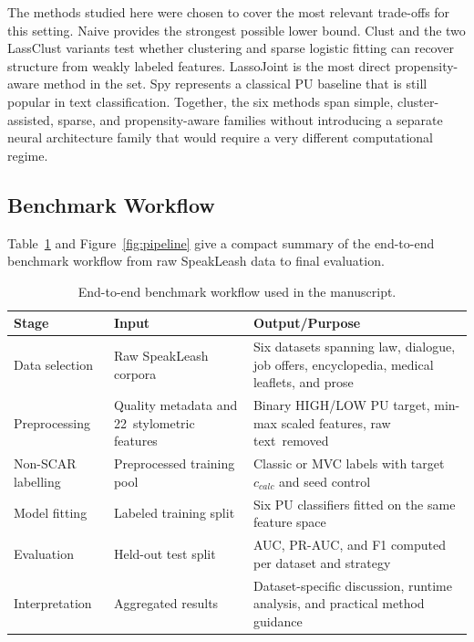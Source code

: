 \documentclass[applsci,article,accept,pdftex,moreauthors]{Definitions/mdpi}
\newcommand{\rev}[1]{{#1}}
\begin{document}
\rev{The methods studied here were chosen to cover the most relevant trade-offs for this setting.} \rev{Naive provides the strongest possible lower bound.} \rev{Clust and the two LassClust variants test whether clustering and sparse logistic fitting can recover structure from weakly labeled features.} \rev{LassoJoint is the most direct propensity-aware method in the set.} \rev{Spy represents a classical PU baseline that is still popular in text classification.} \rev{Together, the six methods span simple, cluster-assisted, sparse, and propensity-aware families without introducing a separate neural architecture family that would require a very different computational regime.}

\subsection{Benchmark Workflow}

\rev{Table~\ref{tab:workflow_summary} and Figure~\ref{fig:pipeline} give a compact summary of the end-to-end benchmark workflow  from raw SpeakLeash data to final evaluation.}

\begin{table}[H]
\centering
\caption{End-to-end benchmark workflow used in the manuscript.}
\label{tab:workflow_summary}
\small
\begin{tabularx}{\textwidth}{l>{\raggedright\arraybackslash}X>{\raggedright\arraybackslash}X}
\toprule
\textbf{Stage} & \textbf{Input} & \textbf{Output/Purpose} \\
\midrule
Data selection & Raw SpeakLeash corpora & Six datasets spanning law, dialogue, job offers, encyclopedia, medical leaflets, and prose \\\midrule
Preprocessing & Quality metadata and 22~stylometric features & Binary HIGH/LOW PU target, min-max scaled features, raw \mbox{text removed} \\\midrule
Non-SCAR labelling & Preprocessed training pool & Classic or MVC labels with target $c_{calc}$ and seed control \\\midrule
Model fitting & Labeled training split & Six PU classifiers fitted on the same feature space \\\midrule
Evaluation & Held-out test split & AUC, PR-AUC, and F1 computed per dataset and strategy \\\midrule
Interpretation & Aggregated results & Dataset-specific discussion, runtime analysis, and practical method guidance \\
\bottomrule
\end{tabularx}
\end{table}
\end{document}
